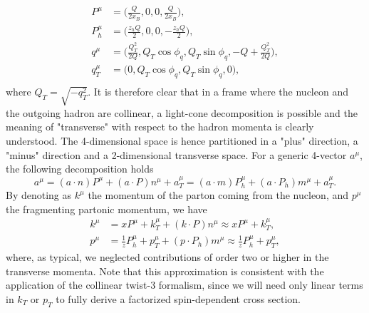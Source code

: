 \begin{equation}
    \begin{aligned}
        P^\mu&=\Big(\frac{Q}{2x_B},0,0,\frac{Q}{2x_B}\Big),\\
        P_h^\mu&=\Big(\frac{z_hQ}{2},0,0,-\frac{z_hQ}{2}\Big),\\
        q^\mu&=\Big(\frac{Q_T^2}{2Q},Q_T\cos\phi_q,Q_T\sin\phi_q,-Q+\frac{Q_T^2}{2Q}\Big),\\
        q^\mu_T&=\Big(0,Q_T\cos\phi_q,Q_T\sin\phi_q,0\Big),\\
    \end{aligned}
\end{equation}
where $Q_T=\sqrt{-q_T^2}$. 
It is therefore clear that in a frame where the nucleon and the outgoing hadron are collinear, a light-cone decomposition is possible and the meaning of "transverse" with respect to the hadron momenta is clearly understood. The 4-dimensional space is hence partitioned in a "plus" direction, a "minus" direction and a 2-dimensional transverse space. For a generic 4-vector $a^\mu$, the following decomposition holds
\begin{equation}
    a^\mu = (a\cdot n)P^\mu + (a \cdot P)n^\mu+a_T^\mu=(a\cdot m)P_h^\mu + (a \cdot P_h)m^\mu+a_T^\mu.
\end{equation}  
By denoting as $k^\mu$ the momentum of the parton coming from the nucleon, and $p^\mu$ the fragmenting partonic momentum,  we have
\begin{equation}
    \begin{aligned}
        k^\mu &= xP^\mu + k_T^\mu+(k\cdot P)n^\mu\approx xP^\mu + k_T^\mu,\\
        p^\mu &= \frac{1}{z}P_h^\mu + p_T^\mu+(p\cdot P_h)m^\mu\approx \frac{1}{z}P_h^\mu + p_T^\mu,
    \end{aligned}
\end{equation}
where, as typical, we neglected contributions of order two or higher in the transverse momenta. Note that this approximation is consistent with the application of the collinear twist-3 formalism, since we will need only linear terms in $k_T$ or $p_T$ to fully derive a factorized spin-dependent cross section.

